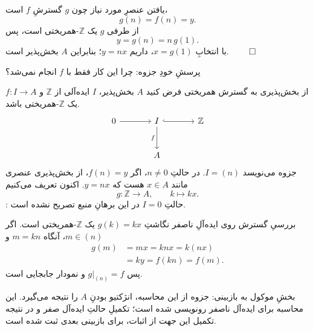\begin{frame}[t]{یافتن عنصرِ مورد نیاز}
  \label{lec18:injective-divisible-element}
  چون $g$ گسترشِ $f$ است،
  \[
    g(n)=f(n)=y.
  \]
  از طرفی $g$ یک $\mathbb Z$-همریختی است، پس
  \[
    y=g(n)=n\,g(1).
  \]
  با انتخابِ $x=g(1)$، داریم $y=nx$؛ بنابراین $A$ بخش‌پذیر است.
  \hfill$\qed$
  \medskip

  \alert{پرسشِ خودِ جزوه: چرا این کار فقط با $f$ انجام نمی‌شد؟}
\end{frame}

\begin{frame}[t]{از بخش‌پذیری به گسترش همریختی}
  \label{lec18:divisible-injective-setup}
  فرض کنید $A$ بخش‌پذیر، $I$ ایده‌آلی از $\mathbb Z$ و
  $f:I\to A$ یک $\mathbb Z$-همریختی باشد.
  \[
    \begin{tikzcd}[ampersand replacement=\&,column sep=large,row sep=large]
      0 \arrow[r] \& I \arrow[r,hook] \arrow[d,"f"'] \& \mathbb Z \\
      \& A \&
    \end{tikzcd}
  \]
  جزوه می‌نویسد $I=(n)$. در حالتِ $n\ne0$، اگر $f(n)=y$،
  از بخش‌پذیری عنصری مانند $x\in A$ هست که $y=nx$.
  اکنون تعریف می‌کنیم
  \[
    g:\mathbb Z\longrightarrow A,\qquad k\longmapsto kx.
  \]
  \alert{: حالتِ $I=0$ در این برهانِ منبع تصریح نشده است.}
\end{frame}

\begin{frame}[t]{بررسیِ گسترش روی ایده‌آلِ ناصفر}
  \label{lec18:divisible-injective-restriction}
  نگاشتِ $g(k)=kx$ یک $\mathbb Z$-همریختی است.
  اگر $m\in(n)$، آنگاه $m=kn$ و
  \[
    \begin{aligned}
      g(m)&=mx=knx=k(nx)\\
          &=ky=f(kn)=f(m).
    \end{aligned}
  \]
  پس $g|_{(n)}=f$ و نمودار جابجایی است.
  \begin{alertblock}{بخشِ موکول به بازبینی: }
    جزوه از این محاسبه، انژکتیو بودنِ $A$ را نتیجه می‌گیرد.
    این محاسبه برای ایده‌آل ناصفر رونویسی شده است؛ تکمیلِ حالتِ ایده‌آل صفر
    و در نتیجه تکمیل این جهت از اثبات، برای بازبینی بعدی ثبت شده است.
  \end{alertblock}
\end{frame}

